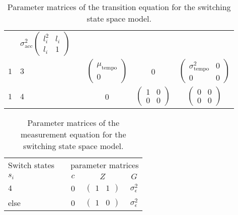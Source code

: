 \documentclass[12pt]{article}
\begin{document}
\begin{table}
\begin{tabular}[h!]{@{}llcccc@{}}
        & $\sigma_{\textrm{acc}}^2\begin{pmatrix} l_i^2 & l_i\\ l_i & 1 \end{pmatrix}$\\
  $1$ & $3$ && $\begin{pmatrix} \mu_{\textrm{tempo}}\\0\end{pmatrix}$ & 0
          & $\begin{pmatrix} \sigma^2_{\textrm{tempo}} & 0\\ 0 & 0 \end{pmatrix}$\\
  $1$ &  $4$ && 0 & $\begin{pmatrix}1&0\\0&0\end{pmatrix}$ 
        & $\begin{pmatrix}0&0\\0&0\end{pmatrix}$\\
  \bottomrule
\end{tabular}
\caption{Parameter matrices of the transition equation for the switching state space model.\label{tab:parmats}}
\end{table}
%
%
\begin{table}
\centering
\begin{tabular}[h!]{@{}llcccc@{}}
\toprule
  \multicolumn{2}{c}{Switch states} &\phantom{a}& \multicolumn{3}{c}{parameter
                                                    matrices}\\
  \cmidrule{1-2} \cmidrule{4-6}
  $s_i$ &&& $c$ & $Z$ & $G$\\
  \midrule
  $4$ & && 0 & $\begin{pmatrix} 1 & 1 \end{pmatrix}$ &
                                                                  $\sigma^2_\epsilon$\\
  else &&& 0 & $\begin{pmatrix} 1 & 0 \end{pmatrix}$ &
                                                                  $\sigma^2_\epsilon$\\
\bottomrule
\end{tabular}
\caption{Parameter matrices of the measurement equation for the switching state space model.\label{tab:parmats2}}
\end{table}
\end{document}
